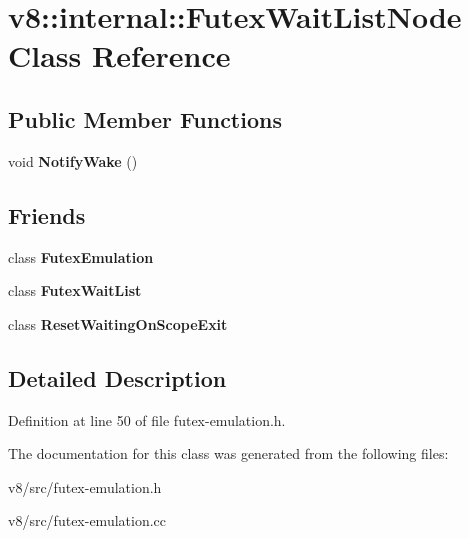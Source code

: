 \hypertarget{classv8_1_1internal_1_1FutexWaitListNode}{}\section{v8\+:\+:internal\+:\+:Futex\+Wait\+List\+Node Class Reference}
\label{classv8_1_1internal_1_1FutexWaitListNode}
\subsection*{Public Member Functions}
\begin{DoxyCompactItemize}
\item 
\mbox{\label{classv8_1_1internal_1_1FutexWaitListNode_ac310901c8f49584034847958877782ab}} 
void {\bfseries Notify\+Wake} ()
\end{DoxyCompactItemize}
\subsection*{Friends}
\begin{DoxyCompactItemize}
\item 
\mbox{\label{classv8_1_1internal_1_1FutexWaitListNode_aac567adb4503b9486e8d84b85a01c1d8}} 
class {\bfseries Futex\+Emulation}
\item 
\mbox{\label{classv8_1_1internal_1_1FutexWaitListNode_a6931106fbd22620029d4a5819e6f001d}} 
class {\bfseries Futex\+Wait\+List}
\item 
\mbox{\label{classv8_1_1internal_1_1FutexWaitListNode_abe629d1dcb9e1589f83d6d6b13458c83}} 
class {\bfseries Reset\+Waiting\+On\+Scope\+Exit}
\end{DoxyCompactItemize}


\subsection{Detailed Description}


Definition at line 50 of file futex-\/emulation.\+h.



The documentation for this class was generated from the following files\+:\begin{DoxyCompactItemize}
\item 
v8/src/futex-\/emulation.\+h\item 
v8/src/futex-\/emulation.\+cc\end{DoxyCompactItemize}
